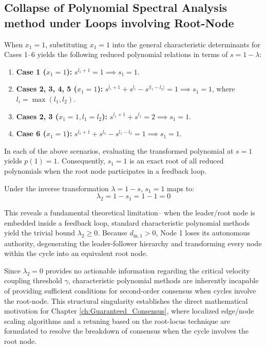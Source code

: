 \subsection{Collapse of Polynomial Spectral Analysis method under Loops involving Root-Node}
When $x_1 = 1$, substituting $x_1 = 1$ into the general characteristic determinants for Cases 1–6 yields the following reduced polynomial relations in terms of $s = 1 - \lambda$:
\begin{enumerate}
	\item \textbf{Case 1 ($x_1 = 1$):} $s^{l_1+1} = 1 \implies s_1 = 1$.
	\item \textbf{Cases 2, 3, 4, 5 ($x_1 = 1$):} $s^{l_i+1} + s^{l_i} - s^{|l_1-l_2|} = 1 \implies s_1 = 1$, where $l_i = \max(l_1, l_2)$.
	\item \textbf{Cases 2, 3 ($x_1 = 1, l_1 = l_2$):} $s^{l_1+1} + s^{l_1} = 2 \implies s_1 = 1$.
	\item \textbf{Case 6 ($x_1 = 1$):} $s^{l_1+1} + s^{l_1} - s^{l_1-l_2} = 1 \implies s_1 = 1$.
\end{enumerate}

In each of the above scenarios, evaluating the transformed polynomial at $s = 1$ yields $p(1) = 1$. Consequently, $s_1 = 1$ is an exact root of all reduced polynomials when the root node participates in a feedback loop. 

Under the inverse transformation $\lambda = 1 - s$, $s_1 = 1$ maps to:
\begin{equation}
	\lambda_2 = 1 - s_1 = 1 - 1 = 0
\end{equation}

This reveals a fundamental theoretical limitation-- when the leader/root node is embedded inside a feedback loop, standard characteristic polynomial methods yield the trivial bound $\lambda_2 \ge 0$. Because $d_{\text{in}, 1} > 0$, Node 1 loses its autonomous authority, degenerating the leader-follower hierarchy and transforming every node within the cycle into an equivalent root node. 

Since $\lambda_2 = 0$ provides no actionable information regarding the critical velocity coupling threshold $\gamma$, characteristic polynomial methods are inherently incapable of providing sufficient conditions for second-order consensus when cycles involve the root-node. This structural singularity establishes the direct mathematical motivation for Chapter \ref{ch:Guaranteed_Consensus}, where localized edge/node scaling algorithms and a retuning based on the root-locus technique are formulated to resolve the breakdown of consensus when the cycle involves the root node.

